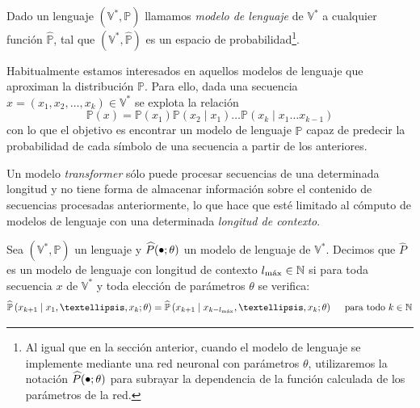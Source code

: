 \begin{definition}
    Dado un lenguaje \( (\mathbb{V}^*, \mathbb{P}) \) llamamos \textit{modelo de lenguaje} de \( \mathbb{V^*} \) a cualquier función \( \widehat{\mathbb{P}} \), tal que \( (\mathbb{V}^*,  \widehat{\mathbb{P}}) \) es un espacio de probabilidad\footnote{Al igual que en la sección anterior, cuando el modelo de lenguaje se implemente mediante una red neuronal con parámetros \( \theta \), utilizaremos la notación \( \widehat{P}(\smallbullet; \theta) \) para subrayar la dependencia de la función calculada de los parámetros de la red.}.
\end{definition}

Habitualmente estamos interesados en aquellos modelos de lenguaje que aproximan la distribución \( \mathbb{P} \). Para ello, dada una secuencia \( x = (x_1, x_2, …, x_k) \in \mathbb{V}^* \) se explota la relación
\[
    \mathbb{P}(x) = \mathbb{P}(x_1) \mathbb{P}(x_2 \mid x_1) \ldots \mathbb{P}(x_k \mid x_1 \ldots x_{k-1})
\]
con lo que el objetivo es encontrar un modelo de lenguaje \( \widehat{\mathbb{P}} \) capaz de predecir la probabilidad de cada símbolo de una secuencia a partir de los anteriores. 

Un modelo \textit{transformer} sólo puede procesar secuencias de una determinada longitud y no tiene forma de almacenar información sobre el contenido de secuencias procesadas anteriormente, lo que hace que esté limitado al cómputo de modelos de lenguaje con una determinada \textit{longitud de contexto}.

\begin{definition}
    Sea  \( (\mathbb{V}^*, \mathbb{P}) \) un lenguaje y \( \widehat{P}(\smallbullet; \theta) \) un modelo de lenguaje de \( \mathbb{V}^* \). Decimos que \( \widehat{P} \) es un modelo de lenguaje con longitud de contexto \( l_\text{máx} \in \mathbb{N} \) si para toda secuencia \( x \) de \( \mathbb{V}^* \) y toda elección de parámetros \( \theta \) se verifica:
    \begin{equation}\label{eq:prob}
        \widehat{\mathbb{P}} \left( x_{k+1} \mid  x_1, …, x_k; \theta \right) = \widehat{\mathbb{P}} \left( x_{k+1} \mid x_{k - l_\text{máx}}, …, x_k; \theta \right) \quad \text{ para todo \(k \in \nat\)}
    \end{equation}
\end{definition}

